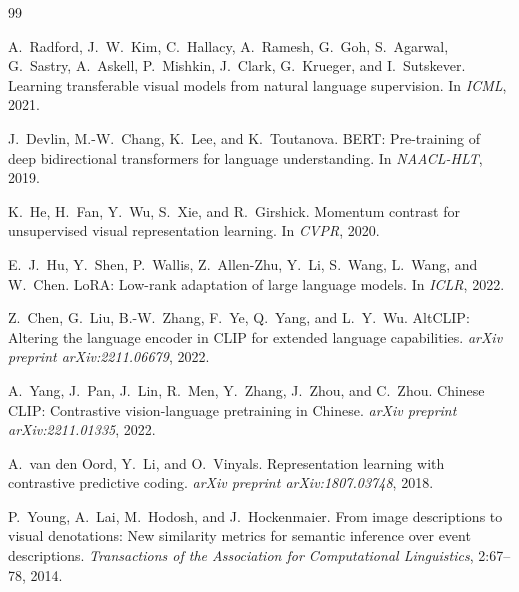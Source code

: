 \documentclass[10pt,a4paper]{ctexart}
\begin{document}

\begin{thebibliography}{99}

A.~Radford, J.~W.~Kim, C.~Hallacy, A.~Ramesh, G.~Goh, S.~Agarwal, G.~Sastry, A.~Askell, P.~Mishkin, J.~Clark, G.~Krueger, and I.~Sutskever.
\newblock Learning transferable visual models from natural language supervision.
\newblock In \textit{ICML}, 2021.

J.~Devlin, M.-W.~Chang, K.~Lee, and K.~Toutanova.
\newblock BERT: Pre-training of deep bidirectional transformers for language understanding.
\newblock In \textit{NAACL-HLT}, 2019.

K.~He, H.~Fan, Y.~Wu, S.~Xie, and R.~Girshick.
\newblock Momentum contrast for unsupervised visual representation learning.
\newblock In \textit{CVPR}, 2020.

E.~J.~Hu, Y.~Shen, P.~Wallis, Z.~Allen-Zhu, Y.~Li, S.~Wang, L.~Wang, and W.~Chen.
\newblock LoRA: Low-rank adaptation of large language models.
\newblock In \textit{ICLR}, 2022.

Z.~Chen, G.~Liu, B.-W.~Zhang, F.~Ye, Q.~Yang, and L.~Y.~Wu.
\newblock AltCLIP: Altering the language encoder in CLIP for extended language capabilities.
\newblock \textit{arXiv preprint arXiv:2211.06679}, 2022.

A.~Yang, J.~Pan, J.~Lin, R.~Men, Y.~Zhang, J.~Zhou, and C.~Zhou.
\newblock Chinese CLIP: Contrastive vision-language pretraining in Chinese.
\newblock \textit{arXiv preprint arXiv:2211.01335}, 2022.

A.~van den Oord, Y.~Li, and O.~Vinyals.
\newblock Representation learning with contrastive predictive coding.
\newblock \textit{arXiv preprint arXiv:1807.03748}, 2018.

P.~Young, A.~Lai, M.~Hodosh, and J.~Hockenmaier.
\newblock From image descriptions to visual denotations: New similarity metrics for semantic inference over event descriptions.
\newblock \textit{Transactions of the Association for Computational Linguistics}, 2:67--78, 2014.


\end{thebibliography}
\end{document}
